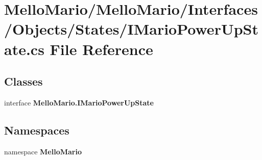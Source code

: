 \section{Mello\+Mario/\+Mello\+Mario/\+Interfaces/\+Objects/\+States/\+I\+Mario\+Power\+Up\+State.cs File Reference}
\label{IMarioPowerUpState_8cs}
\subsection*{Classes}
\begin{DoxyCompactItemize}
\item 
interface \textbf{ Mello\+Mario.\+I\+Mario\+Power\+Up\+State}
\end{DoxyCompactItemize}
\subsection*{Namespaces}
\begin{DoxyCompactItemize}
\item 
namespace \textbf{ Mello\+Mario}
\end{DoxyCompactItemize}
